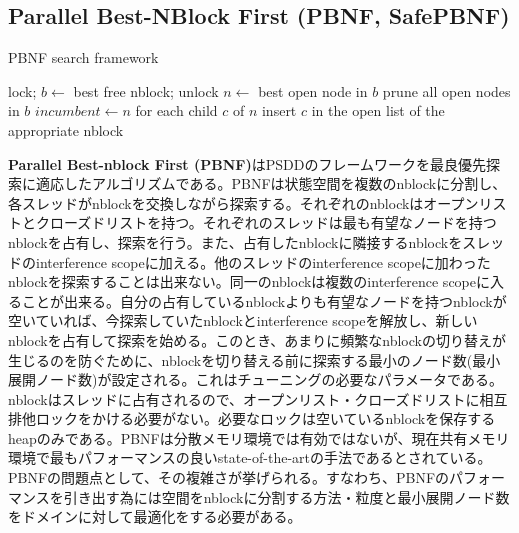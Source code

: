 \documentclass[uplatex]{jsarticle}
\begin{document}
\subsection{Parallel Best-NBlock First (PBNF, SafePBNF)}

\begin{algorithm}                      
\caption{PBNF search framework}         
\label{alg:pbnf}                          
\begin{algorithmic}                  
	\STATE lock; $b \leftarrow$ best free nblock; unlock
		\STATE $n \leftarrow$ best open node in $b$
			\STATE prune all open nodes in $b$
			\STATE $incumbent \leftarrow n$
		\ELSE 
			\STATE for each child $c$ of $n$
			\STATE insert $c$ in the open list of the appropriate nblock
		\ENDIF
\ENDWHILE
\ENDWHILE
\end{algorithmic}
\end{algorithm}

\textbf{Parallel Best-nblock First (PBNF)}はPSDDのフレームワークを最良優先探索に適応したアルゴリズムである。PBNFは状態空間を複数のnblockに分割し、各スレッドがnblockを交換しながら探索する\cite{Burns2010}。それぞれのnblockはオープンリストとクローズドリストを持つ。それぞれのスレッドは最も有望なノードを持つnblockを占有し、探索を行う。また、占有したnblockに隣接するnblockをスレッドのinterference scopeに加える。他のスレッドのinterference scopeに加わったnblockを探索することは出来ない。同一のnblockは複数のinterference scopeに入ることが出来る。自分の占有しているnblockよりも有望なノードを持つnblockが空いていれば、今探索していたnblockとinterference scopeを解放し、新しいnblockを占有して探索を始める。このとき、あまりに頻繁なnblockの切り替えが生じるのを防ぐために、nblockを切り替える前に探索する最小のノード数(最小展開ノード数)が設定される。これはチューニングの必要なパラメータである。nblockはスレッドに占有されるので、オープンリスト・クローズドリストに相互排他ロックをかける必要がない。必要なロックは空いているnblockを保存するheapのみである。PBNFは分散メモリ環境では有効ではないが、現在共有メモリ環境で最もパフォーマンスの良いstate-of-the-artの手法であるとされている。PBNFの問題点として、その複雑さが挙げられる。すなわち、PBNFのパフォーマンスを引き出す為には空間をnblockに分割する方法・粒度と最小展開ノード数をドメインに対して最適化をする必要がある。
\newline
\end{document}
